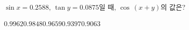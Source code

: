 $\sin x=0.2588$, $\tan y=0.0875$일 때, $\cos\,(x+y)$의 값은?
\begin{choices32}{$0.9962$}{$0.9848$}{$0.9659$}{$0.9397$}{$0.9063$}\end{choices32}
